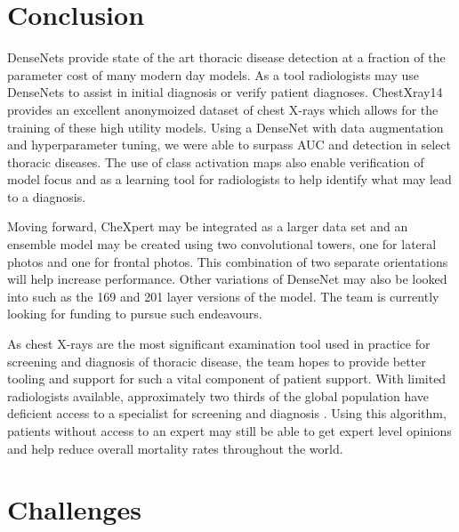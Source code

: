 \documentclass{amia}
\begin{document}
\section*{Conclusion}
DenseNets provide state of the art thoracic disease detection at a fraction of the parameter cost of many modern day models. As a tool radiologists may use DenseNets to assist in initial diagnosis or verify patient diagnoses. ChestXray14 provides an excellent anonymoized dataset of chest X-rays which allows for the training of these high utility models. Using a DenseNet with data augmentation and hyperparameter tuning, we were able to surpass AUC and detection in select thoracic diseases. The use of class activation maps also enable verification of model focus and as a learning tool for radiologists to help identify what may lead to a diagnosis.

Moving forward, CheXpert may be integrated as a larger data set and an ensemble model may be created using two convolutional towers, one for lateral photos and one for frontal photos. This combination of two separate orientations will help increase performance. Other variations of DenseNet may also be looked into such as the 169 and 201 layer versions of the model. The team is currently looking for funding to pursue such endeavours.

As chest X-rays are the most significant examination tool used in practice for screening and diagnosis of thoracic disease, the team hopes to provide better tooling and support for such a vital component of patient support. With limited radiologists available, approximately two thirds of the global population have deficient access to a specialist for screening and diagnosis \cite{ref16}. Using this algorithm, patients without access to an expert may still be able to get expert level opinions and help reduce overall mortality rates throughout the world.

\pagebreak

\section*{Challenges}
\end{document}
